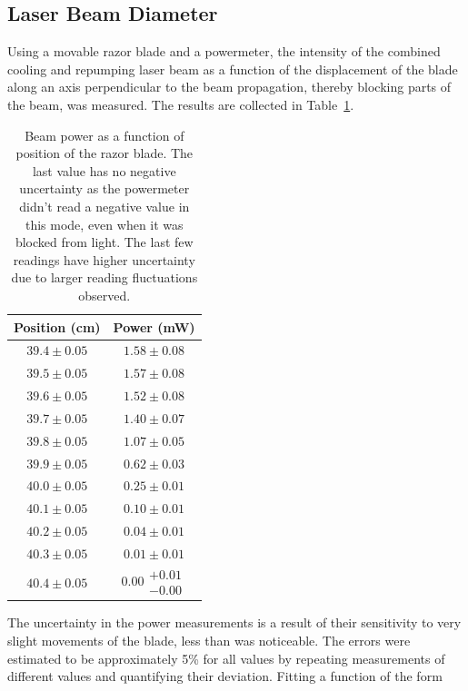 \documentclass[twocolumn]{article}
\begin{document}
\subsection{Laser Beam Diameter}
Using a movable razor blade and a powermeter, the intensity of the combined cooling and repumping laser beam as a function of the displacement of the blade along an axis perpendicular to the beam propagation, thereby blocking parts of the beam, was measured. The results are collected in Table~\ref{table:beampower}. 
\begin{table}
	\centering
	\begin{tabular}{|c|c|}
		\hline
		Position (cm)	& Power (mW)\\
		\hline
		$39.4 \pm 0.05$	&	$1.58 \pm 0.08$\\ 	\hline
		$39.5 \pm 0.05$	&	$1.57 \pm 0.08$\\ 	\hline
		$39.6 \pm 0.05$	&	$1.52 \pm 0.08$\\ 	\hline
		$39.7 \pm 0.05$	&	$1.40 \pm 0.07$\\ 	\hline
		$39.8 \pm 0.05$	&	$1.07 \pm 0.05$\\ 	\hline
		$39.9 \pm 0.05$	&	$0.62 \pm 0.03$\\ 	\hline
		$40.0 \pm 0.05$	&	$0.25 \pm 0.01$\\ 	\hline
		$40.1 \pm 0.05$	&	$0.10 \pm 0.01$\\ 	\hline
		$40.2 \pm 0.05$	&	$0.04 \pm 0.01$\\	\hline
		$40.3 \pm 0.05$	&	$0.01 \pm 0.01$\\	\hline
		$40.4 \pm 0.05$	&	$0.00 \substack{+0.01 \\ -0.00}$\\	\hline
	\end{tabular}
	\caption{Beam power as a function of position of the razor blade. The last value has no negative uncertainty as the powermeter didn't read a negative value in this mode, even when it was blocked from light. The last few readings have higher uncertainty due to larger reading fluctuations observed.}
	\label{table:beampower}
\end{table}
The uncertainty in the power measurements is a result of their sensitivity to very slight movements of the blade, less than was noticeable. The errors were estimated to be approximately 5\% for all values by repeating measurements of different values and quantifying their deviation. Fitting a function of the form
\end{document}
